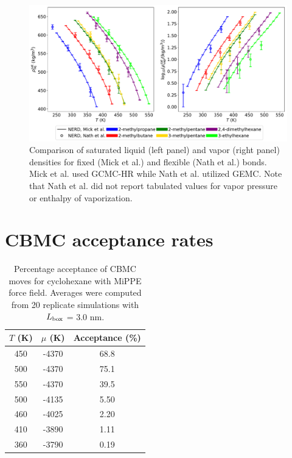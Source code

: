 \documentclass[journal=jctc,manuscript=article]{achemso}
\begin{document}
	\begin{figure}[H]
		\centering
		\includegraphics[width=6.4in]{NERD_fixed_flexible.pdf}
		\caption{Comparison of saturated liquid (left panel) and vapor (right panel) densities for fixed (Mick et al.) and flexible (Nath et al.) bonds. Mick et al. used GCMC-HR while Nath et al. utilized GEMC. Note that Nath et al. did not report tabulated values for vapor pressure or enthalpy of vaporization.}
		\label{SI fig: NERD_fixed_flexible}
	\end{figure}

\newpage
\clearpage

\section{CBMC acceptance rates} \label{SI sec: CBMC acceptance rates}

\begin{table}[htb!]
	\caption{Percentage acceptance of CBMC moves for cyclohexane with MiPPE force field. Averages were computed from 20 replicate simulations with $L_{\rm box}$ = 3.0 nm.}
	\begin{center}
		\begin{tabular}{|c|c|c|}
			\hline
			$T$ (K) & $\mu$ (K) & Acceptance (\%) \\ \hline
			450	&	-4370	&	68.8	\\
			500	&	-4370	&	75.1	\\
			550	&	-4370	&	39.5	\\
			500	&	-4135	&	5.50	\\
			460	&	-4025	&	2.20	\\
			410	&	-3890	&	1.11	\\
			360	&	-3790	&	0.19	\\
			\hline
		\end{tabular}
	\end{center}
\end{table}
\end{document}
